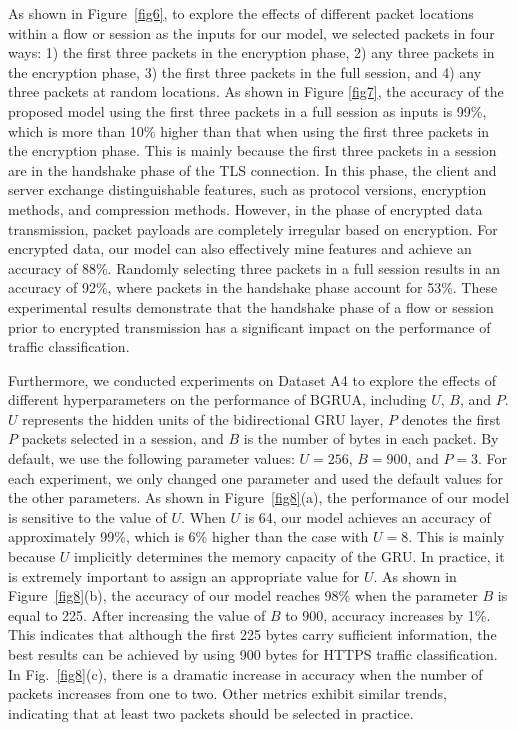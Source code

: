 \documentclass[preprint,12pt]{elsarticle}
\begin{document}
As shown in Figure~\ref{fig6}, to explore the effects of different packet locations within a flow or session as the inputs for our model, we selected packets in four ways: 1) the first three packets in the encryption phase, 2) any three packets in the encryption phase, 3) the first three packets in the full session, and 4) any three packets at random locations. As shown in Figure \ref{fig7}, the accuracy of the proposed model using the first three packets in a full session as inputs is 99\%, which is more than 10\% higher than that when using the first three packets in the encryption phase. This is mainly because the first three packets in a session are in the handshake phase of the TLS connection. In this phase, the client and server exchange distinguishable features, such as protocol versions, encryption methods, and compression methods.
However, in the phase of encrypted data transmission, packet payloads are completely irregular based on encryption. For encrypted data, our model can also effectively mine features and achieve an accuracy of 88\%. Randomly selecting three packets in a full session results in an accuracy of 92\%, where packets in the handshake phase account for 53\%. These experimental results demonstrate that the handshake phase of a flow or session prior to encrypted transmission has a significant impact on the performance of traffic classification.



Furthermore, we conducted experiments on Dataset A4 to explore the effects of different hyperparameters on the performance of BGRUA, including $U$, $B$, and $P$. $U$ represents the hidden units of the bidirectional GRU layer, $P$ denotes the first $P$ packets selected in a session, and $B$ is the number of bytes in each packet. By default, we use the following parameter values: $U = 256$, $B = 900$, and $P = 3$. For each experiment, we only changed one parameter and used the default values for the other parameters. As shown in Figure~\ref{fig8}(a), the performance of our model is sensitive to the value of $U$. When $U$ is 64, our model achieves an accuracy of approximately 99\%, which is 6\% higher than the case with $U = 8$. This is mainly because $U$ implicitly determines the memory capacity of the GRU. In practice, it is extremely important to assign an appropriate value for $U$.
As shown in Figure~\ref{fig8}(b), the accuracy of our model reaches 98\% when the parameter $B$ is equal to 225. After increasing the value of $B$ to 900, accuracy increases by 1\%. This indicates that although the first 225 bytes carry sufficient information, the best results can be achieved by using 900 bytes for HTTPS traffic classification. In Fig.~\ref{fig8}(c), there is a dramatic increase in accuracy when the number of packets increases from one to two. Other metrics exhibit similar trends, indicating that at least two packets should be selected in practice.
\end{document}
